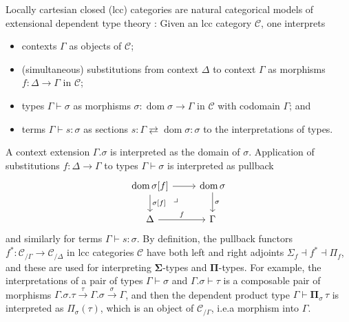 \documentclass[a4paper]{article}
\theoremstyle{remark}
\theoremstyle{definition}
\begin{document}
Locally cartesian closed (lcc) categories are natural categorical models of extensional dependent type theory \citep{lcc-categories-and-type-theory}:
Given an lcc category $\mathcal{C}$, one interprets
\begin{itemize}
  \item
    contexts $\Gamma$ as objects of $\mathcal{C}$;
  \item
    (simultaneous) substitutions from context $\Delta$ to context $\Gamma$ as morphisms $f : \Delta \rightarrow \Gamma$ in $\mathcal{C}$;
  \item
    types $\Gamma \vdash \sigma$ as morphisms $\sigma : \operatorname{dom} \sigma \rightarrow \Gamma$ in $\mathcal{C}$ with codomain $\Gamma$; and
  \item
    terms $\Gamma \vdash s : \sigma$ as sections $s : \Gamma \rightleftarrows \operatorname{dom} \sigma : \sigma$ to the interpretations of types.
\end{itemize}
A context extension $\Gamma.\sigma$ is interpreted as the domain of $\sigma$.
Application of substitutions $f : \Delta \rightarrow \Gamma$ to types $\Gamma \vdash \sigma$ is interpreted as pullback
\begin{equation}
  \begin{tikzcd}
    \operatorname{dom} \sigma[f] \arrow[r] \arrow[d, "{\sigma[f]}"] \arrow[dr, phantom, near start, "\lrcorner"] & \operatorname{dom} \sigma \arrow[d, "\sigma"] \\
    \Delta \arrow[r, "f"] & \Gamma
  \end{tikzcd}
\end{equation}
and similarly for terms $\Gamma \vdash s : \sigma$.
By definition, the pullback functors $f^* : \mathcal{C}_{/ \Gamma} \rightarrow \mathcal{C}_{/ \Delta}$ in lcc categories $\mathcal{C}$ have both left and right adjoints $\Sigma_f \dashv f^* \dashv \Pi_f$, and these are used for interpreting $\mathbf{\Sigma}$-types and $\mathbf{\Pi}$-types.
For example, the interpretations of a pair of types $\Gamma \vdash \sigma$ and $\Gamma.\sigma \vdash \tau$ is a composable pair of morphisms $\Gamma.\sigma.\tau \xrightarrow{\tau} \Gamma.\sigma \xrightarrow{\sigma} \Gamma$, and then the dependent product type $\Gamma \vdash \mathbf{\Pi}_\sigma \, \tau$ is interpreted as $\Pi_\sigma(\tau)$, which is an object of $\mathcal{C}_{/ \Gamma}$, i.e.\@ a morphism into $\Gamma$.
\end{document}
